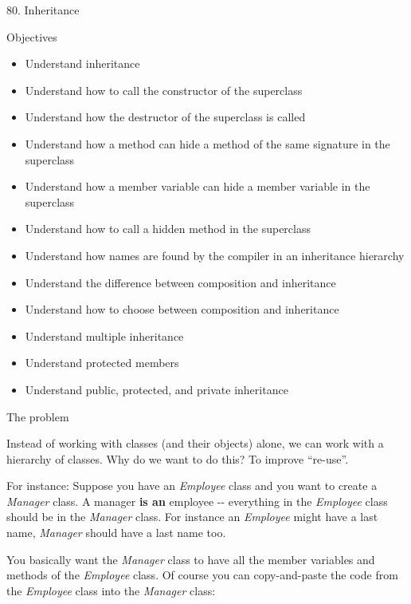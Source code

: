 \documentclass[
]{article}
\author{}
\date{}
\providecommand{\tightlist}{%
  \setlength{\itemsep}{0pt}\setlength{\parskip}{0pt}}
\begin{document}
80. Inheritance

Objectives

\begin{itemize}
\tightlist
\item
  Understand inheritance
\item
  Understand how to call the constructor of the superclass
\item
  Understand how the destructor of the superclass is called
\item
  Understand how a method can hide a method of the same signature in the
  superclass
\item
  Understand how a member variable can hide a member variable in the
  superclass
\item
  Understand how to call a hidden method in the superclass
\item
  Understand how names are found by the compiler in an inheritance
  hierarchy
\item
  Understand the difference between composition and inheritance
\item
  Understand how to choose between composition and inheritance
\item
  Understand multiple inheritance
\item
  Understand protected members
\item
  Understand public, protected, and private inheritance
\end{itemize}

The problem

Instead of working with classes (and their objects) alone, we can work
with a hierarchy of classes. Why do we want to do this? To improve
``re-use''.

For instance: Suppose you have an \emph{Employee} class and you want to
create a \emph{Manager} class. A manager \textbf{is an} employee -\/-
everything in the \emph{Employee} class should be in the \emph{Manager}
class. For instance an \emph{Employee} might have a last name,
\emph{Manager} should have a last name too.

You basically want the \emph{Manager} class to have all the member
variables and methods of the \emph{Employee} class. Of course you can
copy-and-paste the code from the \emph{Employee }class into the
\emph{Manager }class:
\end{document}
